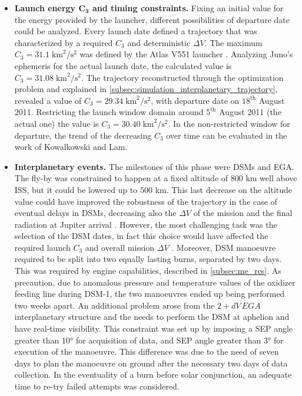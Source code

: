 \begin{itemize} 
    \item \textbf{Launch energy $\boldsymbol{C_3}$ and timing constraints.} Fixing an initial value for the energy provided by the launcher, different possibilities of departure date could be analyzed. Every launch date defined a trajectory that was characterized by a required $C_3$ and deterministic $\Delta V$.
    The maximum $C_3 = 31.1 \; \textrm{km}^2 / \textrm{s}^2$ was defined by the Atlas V551 launcher \cite{atlasV_juno}. Analyzing Juno's ephemeris for the actual launch date, the calculated value is $C_3 = 31.08 \; \textrm{km}^2 / \textrm{s}^2$. The trajectory reconstructed through the optimization problem and explained in \autoref{subsec:simulation_interplanetary_trajectory}, revealed a value of $C_3 =  29.34 \; \textrm{km}^2 / \textrm{s}^2$, with departure date on $18^{\textrm{th}}$ August 2011. Restricting the launch window domain around $5^{\textrm{th}}$ August 2011 (the actual one) the value is $C_3 = 30.40 \; \textrm{km}^2 / \textrm{s}^2$. In the non-restricted window for departure, the trend of the decreasing $C_3$ over time can be evaluated in the work of Kowalkowski and Lam\cite{launch_period}.
    \item \textbf{Interplanetary events.} The milestones of this phase were DSMs and EGA. The fly-by was constrained to happen at a fixed altitude of $800$ km well above ISS, but it could be lowered up to $500$ km.
    This last decrease on the altitude value could have improved the robustness of the trajectory in the case of eventual delays in DSMs, decreasing also the $\Delta V$ of the mission and the final radiation at Jupiter arrival \cite{pre_launch_update}. However, the most challenging task was the selection of the DSM dates, in fact this choice would have affected the required launch $C_3$ and overall mission $\Delta V$ \cite{launch_period}.
    Moreover, DSM manoeuvre required to be split into two equally lasting burns, separated by two days. This was required by engine capabilities, described in \autoref{subsec:me_rcs}. As precaution, due to anomalous pressure and temperature values of the oxidizer feeding line during DSM-1, the two manoeuvres ended up being performed two weeks apart.
    An additional problem arose from the $2+ dV\,EGA$ interplanetary structure and the needs to perform the DSM at aphelion and have real-time visibility. This constraint was set up by imposing a SEP angle greater than 10° for acquisition of data, and SEP angle greater than 3° for execution of the manoeuvre.
    This difference was due to the need of seven days to plan the manoeuvre on ground after the necessary two days of data collection. In the eventuality of a burn before solar conjunction, an adequate time to re-try failed attempts was considered.

\end{itemize}
